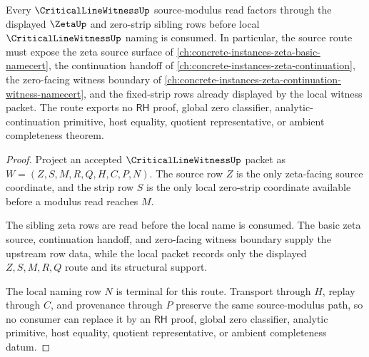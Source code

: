 \begin{theorem}
\label{thm:critical-line-witness-zeta-sibling-route}
Every $\CriticalLineWitnessUp$ source-modulus read factors through the displayed $\ZetaUp$ and zero-strip sibling rows before local $\CriticalLineWitnessUp$ naming is consumed. In particular, the source route must expose the zeta source surface of \autoref{ch:concrete-instances-zeta-basic-namecert}, the continuation handoff of \autoref{ch:concrete-instances-zeta-continuation}, the zero-facing witness boundary of \autoref{ch:concrete-instances-zeta-continuation-witness-namecert}, and the fixed-strip rows already displayed by the local witness packet. The route exports no $\mathsf{RH}$ proof, global zero classifier, analytic-continuation primitive, host equality, quotient representative, or ambient completeness theorem.
\end{theorem}
\begin{proof}
Project an accepted $\CriticalLineWitnessUp$ packet as $W=(Z,S,M,R,Q,H,C,P,N)$. The source row $Z$ is the only zeta-facing source coordinate, and the strip row $S$ is the only local zero-strip coordinate available before a modulus read reaches $M$.

The sibling zeta rows are read before the local name is consumed. The basic zeta source, continuation handoff, and zero-facing witness boundary supply the upstream row data, while the local packet records only the displayed $Z,S,M,R,Q$ route and its structural support.

The local naming row $N$ is terminal for this route. Transport through $H$, replay through $C$, and provenance through $P$ preserve the same source-modulus path, so no consumer can replace it by an $\mathsf{RH}$ proof, global zero classifier, analytic primitive, host equality, quotient representative, or ambient completeness datum.
\end{proof}
